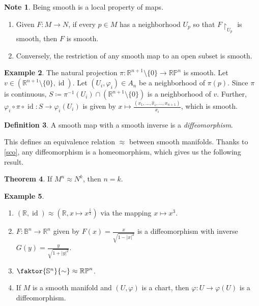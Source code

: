 \documentclass[10pt,letterpaper,cm]{nupset}
\theoremstyle{definition}
\newtheorem{definition}{Definition}[subsection]
\newtheorem{exmp}[definition]{Example}
\newtheorem{note}[definition]{Note}
\theoremstyle{theorem}
\newtheorem{theorem}[definition]{Theorem}
\theoremstyle{remark}
\newcommand{\R}{\mathbb R}
\newcommand{\RP}{\mathbb{RP}}
\renewcommand{\S}{\mathbb S}
\newcommand{\B}{\mathbb{B}}
\newcommand{\1}{\mathbf{1}}
\newcommand{\0}{\vec 0}
\DeclareMathOperator{\id}{id}
\begin{document}
\begin{note} Being smooth is a local property of maps.
\begin{enumerate}
\item Given $F:M\to N$, if every $p\in M$ has a neighborhood $U_p$ so that $F\restriction_{U_p}$ is smooth, then $F$ is smooth.
\item Conversely, the restriction of any smooth map to an open subset is smooth. 
\end{enumerate}
\end{note}

\begin{exmp}
The natural projection $\pi : \R^{n+1}\setminus \{0\} \to \RP^n$ is smooth. Let $v \in \left(\R^{n+1} \setminus \{0\}, \id\right)$. Let $\left(U_i, \varphi_i\right) \in A_n$ be a neighborhood of $\pi(p)$. Since $\pi$ is continuous, $S \coloneqq  \pi^{-1}(U_i) \cap  (\R^{n+1} \setminus \{0\})$ is a neighborhood of $v$. Further, $\varphi_i \circ \pi \circ \id : S \to \varphi_i(U_i)$ is given by $x\mapsto \frac{(x_1, \ldots, \hat{x}_i, \ldots, x_{n+1})}{x_i}$, which is smooth.
\end{exmp}

\begin{definition} 
A smooth map with a smooth inverse is a \textit{diffeomorphism}.
\end{definition}

This defines an equivalence relation $\approx$ between smooth manifolds. Thanks to \cref{sco}, any diffeomorphism is a homeomorphism, which gives us the following result.

\begin{theorem} 
 If $M^n \approx N^k$, then $n =k$.
\end{theorem}


\begin{exmp} $ $
\begin{enumerate}
\item $\left(\R, \id\right) \approx \left(\R, x\mapsto x^{\frac{1}{3}}\right)$ via the mapping $ x \mapsto x^3$.
\item $F: \B^n \to \R^n$ given by $F(x) = \frac{x}{\sqrt{1-\left\lvert{x}\right\rvert^2}}$ is a diffeomorphism with inverse $G(y) = \frac{y}{\sqrt{1+\left\lvert{y}\right\rvert^2}}$.
\item  $\faktor{\S^n}{\sim} \approx \RP^n$.
\item If $M$ is a smooth manifold and $\left(U, \varphi\right)$ is a chart, then $\varphi: U \to \varphi(U)$ is a diffeomorphism.
\end{enumerate}
\end{exmp}
\end{document}
